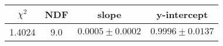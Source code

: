 \begin{tabular}{|c|c|c|c|}

\hline
$\chi^{2}$ & NDF & slope & y-intercept  \\
\hline
1.4024 & 9.0 & $0.0005\pm0.0002$ & $0.9996\pm0.0137$ \\
\hline

\end{tabular}